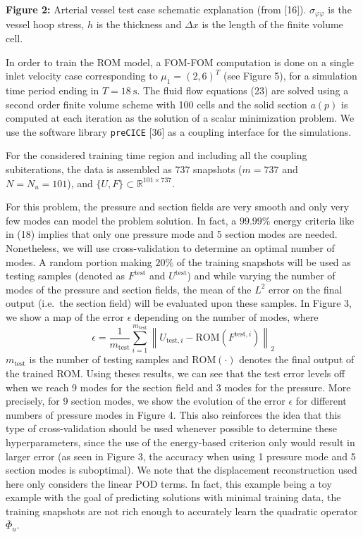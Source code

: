 \documentclass[11pt]{article}
\begin{document}
\begin{center}
\textbf{Figure 2:} Arterial vessel test case schematic explanation (from [16]). $\sigma_{\varphi\varphi}$ is the vessel hoop stress, $h$ is the thickness and $\Delta x$ is the length of the finite volume cell.
\end{center}

In order to train the ROM model, a FOM-FOM computation is done on a single inlet velocity case corresponding to $\mu_1 = (2,6)^T$ (see Figure 5), for a simulation time period ending in $T = 18\ \mathrm{s}$. The fluid flow equations (23) are solved using a second order finite volume scheme with 100 cells and the solid section $a(p)$ is computed at each iteration as the solution of a scalar minimization problem. We use the software library \texttt{preCICE} [36] as a coupling interface for the simulations.

For the considered training time region and including all the coupling subiterations, the data is assembled as 737 snapshots ($m = 737$ and $N = N_u = 101$), and $\{U,F\} \subset \mathbb{R}^{101 \times 737}$.

For this problem, the pressure and section fields are very smooth and only very few modes can model the problem solution. In fact, a $99.99\%$ energy criteria like in (18) implies that only one pressure mode and 5 section modes are needed. Nonetheless, we will use cross-validation to determine an optimal number of modes. A random portion making $20\%$ of the training snapshots will be used as testing samples (denoted as $F^{\mathrm{test}}$ and $U^{\mathrm{test}}$) and while varying the number of modes of the pressure and section fields, the mean of the $L^2$ error on the final output (i.e.\ the section field) will be evaluated upon these samples. In Figure 3, we show a map of the error $\epsilon$ depending on the number of modes, where
\begin{equation}
\tag{26}
\epsilon =
\frac{1}{m_{\mathrm{test}}}
\sum_{i=1}^{m_{\mathrm{test}}}
\left\|
U_{\mathrm{test},i} - \mathrm{ROM}(F^{\mathrm{test},i})
\right\|_2
\end{equation}
$m_{\mathrm{test}}$ is the number of testing samples and $\mathrm{ROM}(\cdot)$ denotes the final output of the trained ROM. Using theses results, we can see that the test error levels off when we reach 9 modes for the section field and 3 modes for the pressure. More precisely, for 9 section modes, we show the evolution of the error $\epsilon$ for different numbers of pressure modes in Figure 4. This also reinforces the idea that this type of cross-validation should be used whenever possible to determine these hyperparameters, since the use of the energy-based criterion only would result in larger error (as seen in Figure 3, the accuracy when using 1 pressure mode and 5 section modes is suboptimal). We note that the displacement reconstruction used here only considers the linear POD terms. In fact, this example being a toy example with the goal of predicting solutions with minimal training data, the training snapshots are not rich enough to accurately learn the quadratic operator $\overline{\Phi}_u$.
\end{document}
